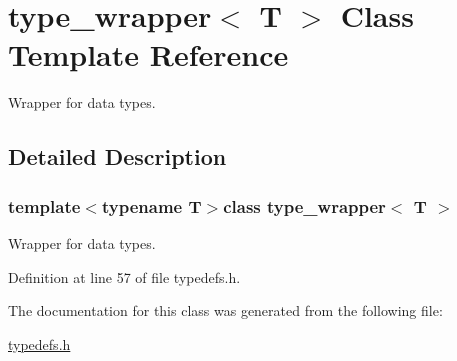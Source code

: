 \hypertarget{classtype__wrapper}{}\section{type\+\_\+wrapper$<$ T $>$ Class Template Reference}
\label{classtype__wrapper}


Wrapper for data types.  




\subsection{Detailed Description}
\subsubsection*{template$<$typename T$>$class type\+\_\+wrapper$<$ T $>$}

Wrapper for data types. 

Definition at line 57 of file typedefs.\+h.



The documentation for this class was generated from the following file\+:\begin{DoxyCompactItemize}
\item 
\hyperlink{typedefs_8h}{typedefs.\+h}\end{DoxyCompactItemize}
